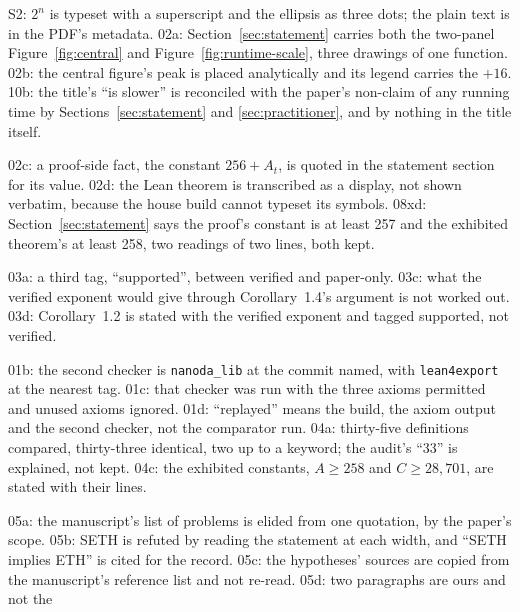 \begin{description}\setlength{\itemsep}{1pt}
\item[The title and its figures.] S2: $2^n$ is typeset with a
  superscript and the ellipsis as three dots; the plain text is in the
  PDF's metadata. 02a: Section~\ref{sec:statement} carries both the
  two-panel Figure~\ref{fig:central} and Figure~\ref{fig:runtime-scale},
  three drawings of one function. 02b: the central figure's peak is
  placed analytically and its legend carries the $+16$. 10b: the
  title's ``is slower'' is reconciled with the paper's non-claim of any
  running time by Sections~\ref{sec:statement} and
  \ref{sec:practitioner}, and by nothing in the title itself.
\item[The statement (Section~\ref{sec:statement}).] 02c: a proof-side
  fact, the constant $256 + A_t$, is quoted in the statement section
  for its value. 02d: the Lean theorem is transcribed as a display, not
  shown verbatim, because the house build cannot typeset its symbols.
  08xd: Section~\ref{sec:statement} says the proof's constant is at
  least 257 and the exhibited theorem's at least 258, two readings of
  two lines, both kept.
\item[Beyond the statement (Section~\ref{sec:beyond}).] 03a: a third
  tag, ``supported'', between verified and paper-only. 03c: what the
  verified exponent would give through Corollary~1.4's argument is not
  worked out. 03d: Corollary~1.2 is stated with the verified exponent
  and tagged supported, not verified.
\item[The proof and the replay (Sections~\ref{sec:proof} and
  \ref{sec:replay}).] 01b: the second checker is \texttt{nanoda\_lib}
  at the commit named, with \texttt{lean4export} at the nearest tag.
  01c: that checker was run with the three axioms permitted and unused
  axioms ignored. 01d: ``replayed'' means the build, the axiom output
  and the second checker, not the comparator run. 04a: thirty-five
  definitions compared, thirty-three identical, two up to a keyword;
  the audit's ``33'' is explained, not kept. 04c: the exhibited
  constants, $A \ge 258$ and $C \ge 28{,}701$, are stated with their
  lines.
\item[What follows (Section~\ref{sec:consequences}).] 05a: the
  manuscript's list of problems is elided from one quotation, by the
  paper's scope. 05b: SETH is refuted by reading the statement at each
  width, and ``SETH implies ETH'' is cited for the record. 05c: the
  hypotheses' sources are copied from the manuscript's reference list
  and not re-read. 05d: two paragraphs are ours and not the

\end{description}
